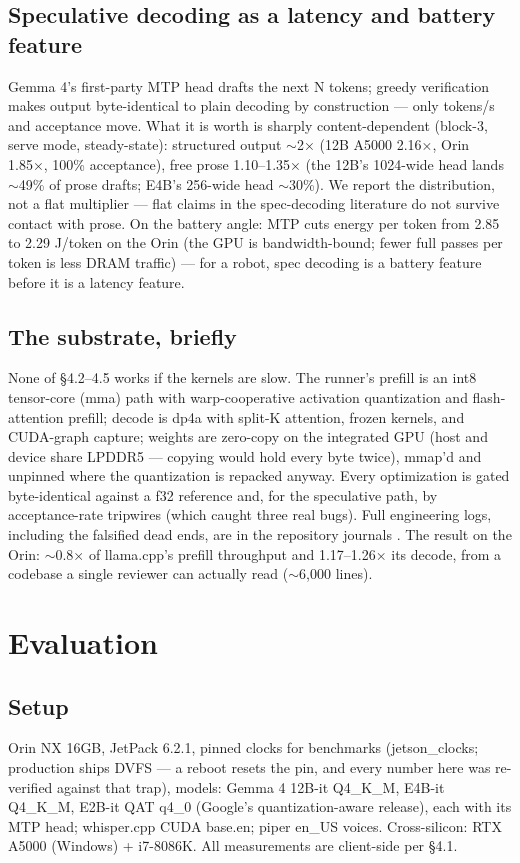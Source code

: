 \documentclass[journal]{IEEEtran}
\begin{document}
\subsection{Speculative decoding as a latency and battery feature}
Gemma 4's first-party MTP head drafts the next N tokens; greedy verification makes output byte-identical to plain decoding by construction — only tokens/s and acceptance move. What it is worth is sharply content-dependent (block-3, serve mode, steady-state): structured output $\sim$2× (12B A5000 2.16×, Orin 1.85×, 100\% acceptance), free prose 1.10–1.35× (the 12B's 1024-wide head lands $\sim$49\% of prose drafts; E4B's 256-wide head $\sim$30\%). We report the distribution, not a flat multiplier — flat claims in the spec-decoding literature do not survive contact with prose. On the battery angle: MTP cuts energy per token from 2.85 to 2.29 J/token on the Orin (the GPU is bandwidth-bound; fewer full passes per token is less DRAM traffic) — for a robot, spec decoding is a battery feature before it is a latency feature.

\subsection{The substrate, briefly}
None of §4.2–4.5 works if the kernels are slow. The runner's prefill is an int8 tensor-core (mma) path with warp-cooperative activation quantization and flash-attention prefill; decode is dp4a with split-K attention, frozen kernels, and CUDA-graph capture; weights are zero-copy on the integrated GPU (host and device share LPDDR5 — copying would hold every byte twice), mmap'd and unpinned where the quantization is repacked anyway. Every optimization is gated byte-identical against a f32 reference and, for the speculative path, by acceptance-rate tripwires (which caught three real bugs). Full engineering logs, including the falsified dead ends, are in the repository journals \cite{littlegemma}. The result on the Orin: $\sim$0.8× of llama.cpp's prefill throughput and 1.17–1.26× its decode, from a codebase a single reviewer can actually read ($\sim$6,000 lines).

\section{Evaluation}

\subsection{Setup}
Orin NX 16GB, JetPack 6.2.1, pinned clocks for benchmarks (jetson\_clocks; production ships DVFS — a reboot resets the pin, and every number here was re-verified against that trap), models: Gemma 4 12B-it Q4\_K\_M, E4B-it Q4\_K\_M, E2B-it QAT q4\_0 (Google's quantization-aware release), each with its MTP head; whisper.cpp CUDA base.en; piper en\_US voices. Cross-silicon: RTX A5000 (Windows) + i7-8086K. All measurements are client-side per §4.1.
\end{document}
